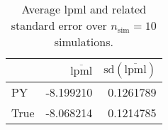 \begin{table}[H]

\caption{Average lpml and related standard error over $n_{\text{sim}} = 10$ simulations.}
\centering
\begin{tabular}[t]{lrr}
\toprule
  & $\overbar{\text{lpml}}$ & $\text{sd}(\overbar{\text{lpml}})$\\
\midrule
PY & -8.199210 & 0.1261789\\
True & -8.068214 & 0.1214785\\
\bottomrule
\end{tabular}
\end{table}